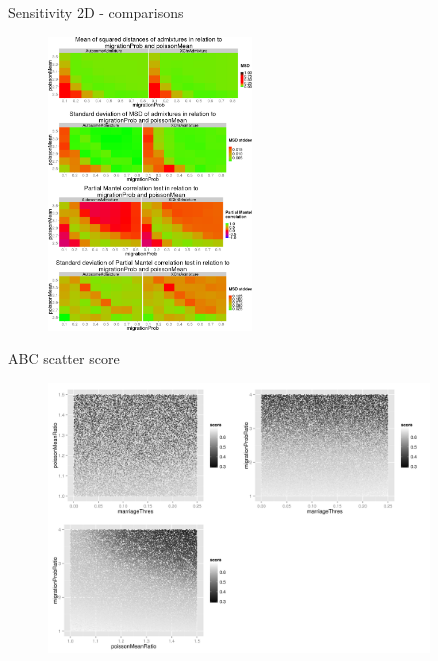 \documentclass[10pt, aspectratio=43]{beamer}
\begin{document}
\begin{frame}{}{Sensitivity 2D - comparisons}
\begin{figure}
  \includegraphics[width=0.48\textwidth]{../data/sensit-comp-2d.png}
\end{figure}
\end{frame}

\begin{frame}{}{ABC scatter score}
\begin{figure}
  \includegraphics[width=0.9\textwidth]{../data/abc-scatter-score.png}
\end{figure}
\end{frame}
\end{document}
